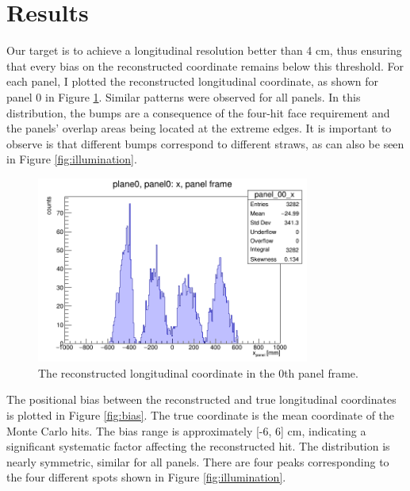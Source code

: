 \section{Results}

Our target is to achieve a longitudinal resolution better than 4 cm, thus ensuring that every bias on the reconstructed coordinate 
remains below this threshold. For each panel, I plotted the reconstructed longitudinal coordinate, as shown for panel 0 in Figure \ref{fig:recx}. 
Similar patterns were observed for all panels. In this distribution, the bumps are a consequence of the four-hit face requirement and the panels' overlap areas being located at the extreme edges. 
It is important to observe is that different bumps correspond to different straws, as can also be seen in Figure \ref{fig:illumination}.
\begin{figure}[!h]
    \centering
    \includegraphics[width=0.8\textwidth]{figures/png/x_panel0.png}
    \caption{The reconstructed longitudinal coordinate in the 0th panel frame.}
    \label{fig:recx}
\end{figure}
The positional bias between the reconstructed and true longitudinal coordinates is plotted in 
Figure \ref{fig:bias}. The true coordinate is the mean coordinate of the Monte Carlo hits. The bias range is approximately [-6, 6] cm, 
indicating a significant systematic factor affecting the reconstructed hit. The distribution is nearly symmetric, similar for all panels. 
There are four peaks corresponding to the four different spots shown in Figure \ref{fig:illumination}.

